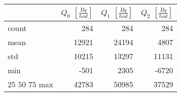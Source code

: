 \begin{tabular}{lrrr}
\toprule
{} &  $Q_0$ $\left[\si{\frac{Bq}{hod}}\right]$ &  $Q_1$ $\left[\si{\frac{Bq}{hod}}\right]$ &  $Q_2$ $\left[\si{\frac{Bq}{hod}}\right]$ \\
\midrule
count &                                       284 &                                       284 &                                       284 \\
mean  &                                     12921 &                                     24194 &                                      4807 \\
std   &                                     10215 &                                     13297 &                                     11131 \\
min   &                                      -501 &                                      2305 &                                     -6720 \\
25%
50%
75%
max   &                                     42783 &                                     50985 &                                     37529 \\
\bottomrule
\end{tabular}
